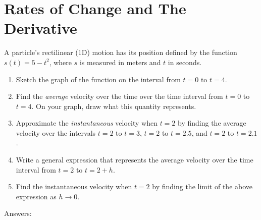 
\section{Rates of Change and The Derivative}
A particle's rectilinear (1D) motion has its position defined by the function $s(t) = 5 - t^2$, where $s$ is measured in meters and $t$ in seconds.
\begin{enumerate}
    \item Sketch the graph of the function on the interval from $t = 0$ to $t = 4$.
    \item Find the \textit{average} velocity over the time over the time interval from $t = 0$ to $t = 4$. On your graph, draw what this quantity represents.
    \item Approximate the \textit{instantaneous} velocity when $t = 2$ by finding the average velocity over the intervals $t = 2$ to $t = 3$, $t = 2$ to $t = 2.5$, and $t = 2$ to $t = 2.1$.
    \item Write a general expression that represents the average velocity over the time interval from $t = 2$ to $t = 2 + h$.
    \item Find the instantaneous velocity when $t = 2$ by finding the limit of the above expression as $h \to 0$.
\end{enumerate}
Answers:
